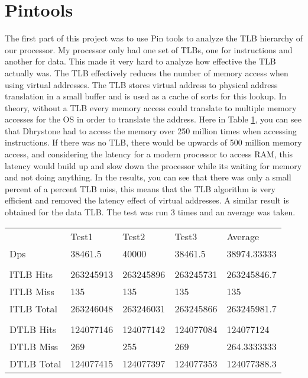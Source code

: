 \documentclass{article}
\begin{document}
	\section{Pintools}
		The first part of this project was to use Pin tools to analyze the TLB hierarchy of our processor. My processor only had one set of TLBs, one for instructions and another for data. This made it very hard to analyze how effective the TLB actually was. The TLB effectively reduces the number of memory access when using virtual addresses. The TLB stores virtual address to physical address translation in a small buffer and is used as a cache of sorts for this lookup. In theory, without a TLB every memory access could translate to multiple memory accesses for the OS in order to translate the address. Here in Table \ref{tlb:table}, you can see that Dhrystone had to access the memory over 250 million times when accessing instructions. If there was no TLB, there would be upwards of 500 million memory access, and considering the latency for a modern processor to access RAM, this latency would build up and slow down the processor while its waiting for memory and not doing anything. In the results, you can see that there was only a small percent of a percent TLB miss, this means that the TLB algorithm is very efficient and removed the latency effect of virtual addresses. A similar result is obtained for the data TLB. The test was run 3 times and an average was taken. 
		
		\begin{table}[H]
			\label{tlb:table}
			\centering 
			\begin{tabular}{lllll}
				    & Test1 & Test2 & Test3 & Average \\ 
				Dps & 38461.5 & 40000 & 38461.5 & 38974.33333 \\ 
				& & & & \\
				ITLB Hits & 263245913 & 263245896 & 263245731 & 263245846.7 \\
				ITLB Miss & 135 & 135 & 135 & 135 \\
				ITLB Total & 263246048 & 263246031 & 263245866 & 263245981.7 \\
				& & & & \\
				DTLB Hits & 124077146 & 124077142 & 124077084 & 124077124 \\
				DTLB Miss & 269 & 255 & 269 & 264.3333333 \\
				DTLB Total & 124077415 & 124077397 & 124077353 & 124077388.3
			\end{tabular}
		\end{table}
\end{document}
